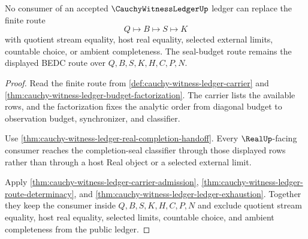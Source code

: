 \begin{theorem}
\label{thm:cauchy-witness-ledger-seal-budget-nonescape}
No consumer of an accepted $\CauchyWitnessLedgerUp$ ledger can replace the finite route
$$
Q \longmapsto B \longmapsto S \longmapsto K
$$
with quotient stream equality, host real equality, selected external limits, countable choice, or ambient completeness. The seal-budget route remains the displayed BEDC route over $Q,B,S,K,H,C,P,N$.
\end{theorem}
\begin{proof}
Read the finite route from \autoref{def:cauchy-witness-ledger-carrier} and \autoref{thm:cauchy-witness-ledger-budget-factorization}. The carrier lists the available rows, and the factorization fixes the analytic order from diagonal budget to observation budget, synchronizer, and classifier.

Use \autoref{thm:cauchy-witness-ledger-real-completion-handoff}. Every $\RealUp$-facing consumer reaches the completion-seal classifier through those displayed rows rather than through a host Real object or a selected external limit.

Apply \autoref{thm:cauchy-witness-ledger-carrier-admission}, \autoref{thm:cauchy-witness-ledger-route-determinacy}, and \autoref{thm:cauchy-witness-ledger-ledger-exhaustion}. Together they keep the consumer inside $Q,B,S,K,H,C,P,N$ and exclude quotient stream equality, host real equality, selected limits, countable choice, and ambient completeness from the public ledger.
\end{proof}

